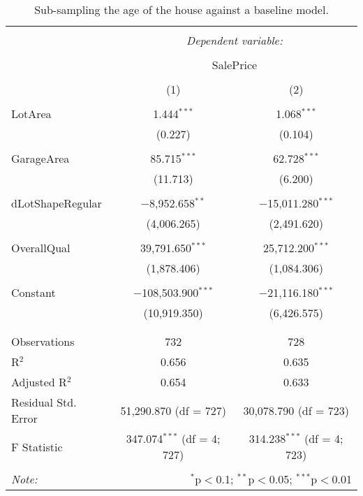 \documentclass{article}
\begin{document}
\begin{table}[h]
\centering
\caption{\label{tab:age} Sub-sampling the age of the house against a baseline model.}
\begin{tabular}{@{\extracolsep{5pt}}lcc} 
\\[-1.8ex]\hline 
\hline \\[-1.8ex] 
 & \multicolumn{2}{c}{\textit{Dependent variable:}} \\ 
\cline{2-3} 
\\[-1.8ex] & \multicolumn{2}{c}{SalePrice} \\ 
\\[-1.8ex] & (1) & (2)\\ 
\hline \\[-1.8ex] 
 LotArea & 1.444$^{***}$ & 1.068$^{***}$ \\ 
  & (0.227) & (0.104) \\ 
  & & \\ 
 GarageArea & 85.715$^{***}$ & 62.728$^{***}$ \\ 
  & (11.713) & (6.200) \\ 
  & & \\ 
 dLotShapeRegular & $-$8,952.658$^{**}$ & $-$15,011.280$^{***}$ \\ 
  & (4,006.265) & (2,491.620) \\ 
  & & \\ 
 OverallQual & 39,791.650$^{***}$ & 25,712.200$^{***}$ \\ 
  & (1,878.406) & (1,084.306) \\ 
  & & \\ 
 Constant & $-$108,503.900$^{***}$ & $-$21,116.180$^{***}$ \\ 
  & (10,919.350) & (6,426.575) \\ 
  & & \\ 
\hline \\[-1.8ex] 
Observations & 732 & 728 \\ 
R$^{2}$ & 0.656 & 0.635 \\ 
Adjusted R$^{2}$ & 0.654 & 0.633 \\ 
Residual Std. Error & 51,290.870 (df = 727) & 30,078.790 (df = 723) \\ 
F Statistic & 347.074$^{***}$ (df = 4; 727) & 314.238$^{***}$ (df = 4; 723) \\ 
\hline 
\hline \\[-1.8ex] 
\textit{Note:}  & \multicolumn{2}{r}{$^{*}$p$<$0.1; $^{**}$p$<$0.05; $^{***}$p$<$0.01} \\ 
\end{tabular} 
\end{table} 
\end{document}

